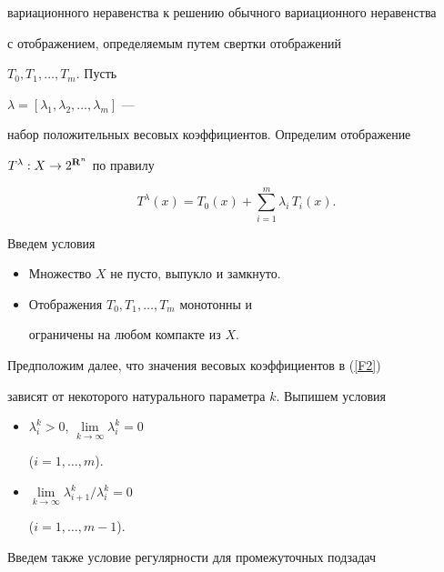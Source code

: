 вариационного неравенства к решению обычного вариационного неравенства


с отображением, определяемым путем свертки отображений


$T_0,T_1,\dotsc,T_m$. Пусть


$\lambda=[\lambda_1,\lambda_2,\dotsc,\lambda_m]$ ---


набор положительных весовых коэффициентов. Определим отображение


$T^\lambda: X\to 2^{\bold R^n}$ по правилу


\begin{equation}


\label{F2}


T^\lambda (x)=T_0(x)+\sum^m_{i=1}\lambda_i\,T_i(x).


\end{equation}





Введем условия


\begin{itemize}


\item[A1.] Множество $X$ не пусто, выпукло и замкнуто.


\item[A2.] Отображения $T_0,T_1,\dotsc,T_m$ монотонны и


ограничены на любом компакте из $X$.


\end{itemize}





Предположим далее, что значения весовых коэффициентов в (\ref{F2})


зависят от некоторого натурального параметра $k$. Выпишем условия


\begin{itemize}


\item[A3.] $\lambda_i^k>0$, $\lim\limits_{k\to\infty}\lambda_i^k=0$


($i=1,\dotsc,m$).


\item[A4.] $\lim\limits_{k\to\infty}\lambda_{i+1}^k/\lambda_i^k=0$


($i=1,\dotsc,m-1$).


\end{itemize}





Введем также условие регулярности для промежуточных подзадач


